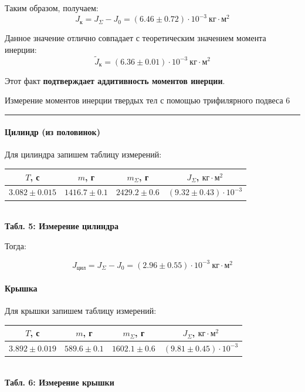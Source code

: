 \documentclass[12pt,a4paper]{scrartcl}
\begin{document}
	Таким образом, получаем:
	$$J_{\text{к}} = J_{\Sigma} - J_0 = (6.46 \pm 0.72) \cdot 10^{-3}\ \text{кг}\cdot\text{м}^2$$
	
	Данное значение отлично совпадает с теоретическим значением момента инерции:
	$$\tilde{J}_{\text{к}} = (6.36 \pm 0.01) \cdot 10^{-3}\ \text{кг}\cdot\text{м}^2$$
	
	Этот факт \textbf{подтверждает аддитивность моментов инерции}.
	
	\newpage
	
	
	\begin{flushleft}
		\footnotesize{Измерение моментов инерции твердых тел с помощью трифилярного подвеса} \hspace{\fill} \footnotesize{6}
		\\[-0.3cm]\noindent\rule{\textwidth}{0.3pt}
	\end{flushleft}
	
	\paragraph{Цилиндр (из половинок)} \hfill
	
	Для цилиндра запишем таблицу измерений:
	
	\begin{center}
		\begin{tabular}{|c|c|c|c|}
			\hline
			$T$, с & $m$, г & $m_{\Sigma}$, г & $J_\Sigma$, $\text{кг}\cdot\text{м}^2$
			\\\hline
			$3.082 \pm 0.015$ & $1416.7 \pm 0.1$ & $2429.2 \pm 0.6$ & $(9.32 \pm 0.43) \cdot 10^{-3}$
			\\\hline
		\end{tabular}
		\\\textbf{Табл. 5: Измерение цилиндра}
	\end{center}

	Тогда:
	
	$$J_{\text{цил}} = J_\Sigma - J_0 = (2.96 \pm 0.55) \cdot 10^{-3}\ \text{кг}\cdot\text{м}^2$$
	
	\paragraph{Крышка} \hfill
	
	Для крышки запишем таблицу измерений:
	
	\begin{center}
		\begin{tabular}{|c|c|c|c|}
			\hline
			$T$, с & $m$, г & $m_{\Sigma}$, г & $J_\Sigma$, $\text{кг}\cdot\text{м}^2$
			\\\hline
			$3.892 \pm 0.019$ & $589.6 \pm 0.1$ & $1602.1 \pm 0.6$ & $(9.81 \pm 0.45) \cdot 10^{-3}$
			\\\hline
		\end{tabular}
		\\\textbf{Табл. 6: Измерение крышки}
	\end{center}
	
\end{document}
